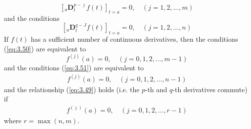 \documentclass[a4paper,14pt,oneside]{book}
\theoremstyle{plain}
\theoremstyle{definition}
\theoremstyle{remark}
\begin{document}
\begin{center}
\begin{flushleft}
{\begin{equation}\label{eq:3.50}
\left[{ }_{a} \mathbf{D}_{t}^{p-\jmath} f(t)\right]_{t=a}=0, \quad(j=1,2, \ldots, m)
\end{equation}
and the conditions
\begin{equation}\label{eq:3.51}
\left[{ }_{a} \mathbf{D}_{t}^{q-J} f(t)\right]_{t=a}=0, \quad(j=1,2, \ldots, n)
\end{equation}
If $f(t)$ has a sufficient number of continuous derivatives, then the conditions (\ref{eq:3.50}) are equivalent to
\begin{equation}\label{eq:3.52}
f^{(j)}(a)=0, \quad(j=0,1,2, \ldots, m-1)
\end{equation}
and the conditions (\ref{eq:3.51}) are equivalent to
\begin{align}\label{eq:3.53}
f^{(j)}(a)=0, \quad(j=0,1,2, \ldots, n-1)
\end{align}
and the relationship (\ref{eq:3.49}) holds (i.e. the $p$-th and $q$-th derivatives commute) if
\begin{align}
f^{(\jmath)}(a)=0, \quad(j=0,1,2, \ldots, r-1)
\end{align}
where $r=\max (n, m)$.}
\end{flushleft}       
\end{center}
\end{document}
